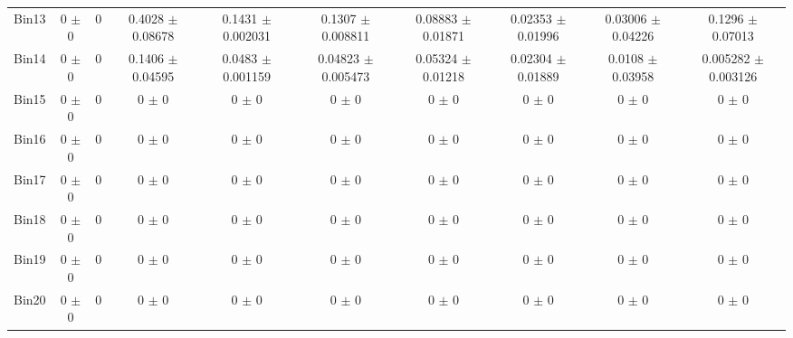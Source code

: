 \begin{tabular}{@{\extracolsep{4pt}}lccccccccc@{}}
     Bin13 & 0 $\pm$ 0 & 0 & 0.4028 $\pm$ 0.08678 & 0.1431 $\pm$ 0.002031 & 0.1307 $\pm$ 0.008811 & 0.08883 $\pm$ 0.01871 & 0.02353 $\pm$ 0.01996 & 0.03006 $\pm$ 0.04226 & 0.1296 $\pm$ 0.07013 \\ 
     Bin14 & 0 $\pm$ 0 & 0 & 0.1406 $\pm$ 0.04595 & 0.0483 $\pm$ 0.001159 & 0.04823 $\pm$ 0.005473 & 0.05324 $\pm$ 0.01218 & 0.02304 $\pm$ 0.01889 & 0.0108 $\pm$ 0.03958 & 0.005282 $\pm$ 0.003126 \\ 
     Bin15 & 0 $\pm$ 0 & 0 & 0 $\pm$ 0 & 0 $\pm$ 0 & 0 $\pm$ 0 & 0 $\pm$ 0 & 0 $\pm$ 0 & 0 $\pm$ 0 & 0 $\pm$ 0 \\ 
     Bin16 & 0 $\pm$ 0 & 0 & 0 $\pm$ 0 & 0 $\pm$ 0 & 0 $\pm$ 0 & 0 $\pm$ 0 & 0 $\pm$ 0 & 0 $\pm$ 0 & 0 $\pm$ 0 \\ 
     Bin17 & 0 $\pm$ 0 & 0 & 0 $\pm$ 0 & 0 $\pm$ 0 & 0 $\pm$ 0 & 0 $\pm$ 0 & 0 $\pm$ 0 & 0 $\pm$ 0 & 0 $\pm$ 0 \\ 
     Bin18 & 0 $\pm$ 0 & 0 & 0 $\pm$ 0 & 0 $\pm$ 0 & 0 $\pm$ 0 & 0 $\pm$ 0 & 0 $\pm$ 0 & 0 $\pm$ 0 & 0 $\pm$ 0 \\ 
     Bin19 & 0 $\pm$ 0 & 0 & 0 $\pm$ 0 & 0 $\pm$ 0 & 0 $\pm$ 0 & 0 $\pm$ 0 & 0 $\pm$ 0 & 0 $\pm$ 0 & 0 $\pm$ 0 \\ 
     Bin20 & 0 $\pm$ 0 & 0 & 0 $\pm$ 0 & 0 $\pm$ 0 & 0 $\pm$ 0 & 0 $\pm$ 0 & 0 $\pm$ 0 & 0 $\pm$ 0 & 0 $\pm$ 0 \\ 
\hline\hline
  \end{tabular}
